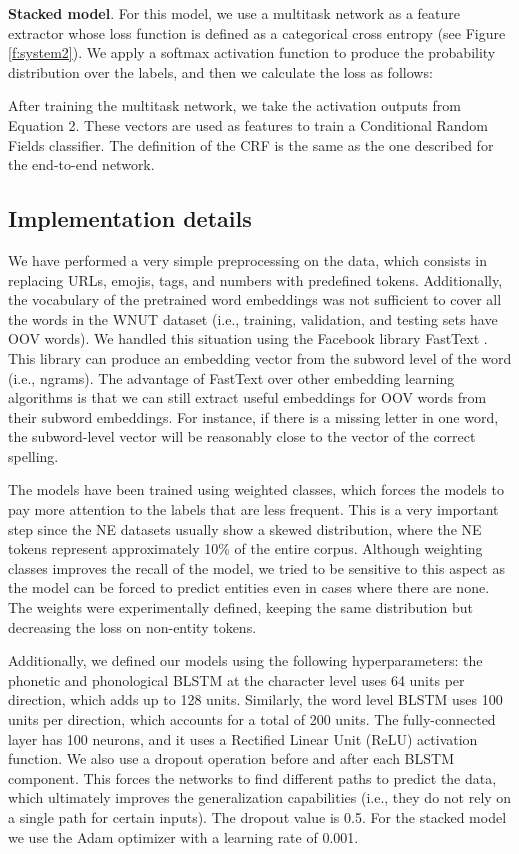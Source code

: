 \documentclass[11pt,a4paper]{article}
\begin{document}
\noindent\textbf{Stacked model}. For this model, we use a multitask network as a feature extractor whose loss function is defined as a categorical cross entropy (see Figure \ref{f:system2}). We apply a softmax activation function to produce the probability distribution over the labels, and then we calculate the loss as follows:

After training the multitask network, we take the activation outputs from Equation 2. These vectors are used as features to train a Conditional Random Fields classifier. The definition of the CRF is the same as the one described for the end-to-end network.

\subsection{Implementation details}

We have performed a very simple preprocessing on the data, which consists in replacing URLs, emojis, tags, and numbers with predefined tokens. Additionally, the vocabulary of the pretrained word embeddings was not sufficient to cover all the words in the WNUT dataset (i.e., training, validation, and testing sets have OOV words). We handled this situation using the Facebook library FastText \citep{bojanowski2016enriching}. 
This library can produce an embedding vector from the subword level of the word (i.e., ngrams). The advantage of FastText over other embedding learning algorithms is that we can still extract useful embeddings for OOV words from their subword embeddings. For instance, if there is a missing letter in one word, the subword-level vector will be reasonably close to the vector of the correct spelling.

The models have been trained using weighted classes, which forces the models to pay more attention to the labels that are less frequent. This is a very important step since the NE datasets usually show a skewed distribution, where the NE tokens represent approximately 10\% of the entire corpus. Although weighting classes improves the recall of the model, we tried to be sensitive to this aspect as the model can be forced to predict entities even in cases where there are none. The weights were experimentally defined, keeping the same distribution but decreasing the loss on non-entity tokens. 

Additionally, we defined our models using the following hyperparameters: the phonetic and phonological BLSTM at the character level uses 64 units per direction, which adds up to 128 units. Similarly, the word level BLSTM uses 100 units per direction, which accounts for a total of 200 units. The fully-connected layer has 100 neurons, and it uses a Rectified Linear Unit (ReLU) activation function. We also use a dropout operation before and after each BLSTM component. This forces the networks to find different paths to predict the data, which ultimately improves the generalization capabilities (i.e., they do not rely on a single path for certain inputs). The dropout value is 0.5. For the stacked model we use the Adam optimizer \citep{DBLP:journals/corr/KingmaB14} with a learning rate of 0.001.
\end{document}
